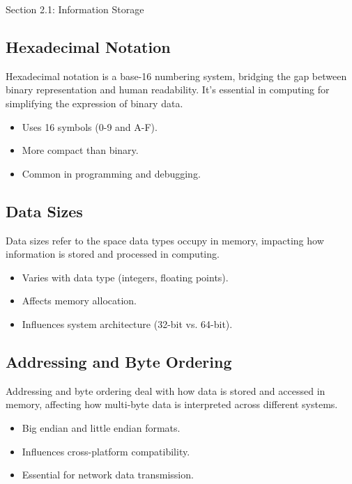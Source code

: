 \begin{notes}{Section 2.1: Information Storage}
    \subsection*{Hexadecimal Notation}

    Hexadecimal notation is a base-16 numbering system, bridging the gap between binary representation and human readability. It's essential in computing for simplifying the expression of binary data.

    \begin{itemize}
        \item Uses 16 symbols (0-9 and A-F).
        \item More compact than binary.
        \item Common in programming and debugging.
    \end{itemize}
    
    \subsection*{Data Sizes}

    Data sizes refer to the space data types occupy in memory, impacting how information is stored and processed in computing.

    \begin{itemize}
        \item Varies with data type (integers, floating points).
        \item Affects memory allocation.
        \item Influences system architecture (32-bit vs. 64-bit).
    \end{itemize}
    
    \subsection*{Addressing and Byte Ordering}

    Addressing and byte ordering deal with how data is stored and accessed in memory, affecting how multi-byte data is interpreted across different systems.

    \begin{itemize}
        \item Big endian and little endian formats.
        \item Influences cross-platform compatibility.
        \item Essential for network data transmission.
    \end{itemize}
    

\end{notes}

